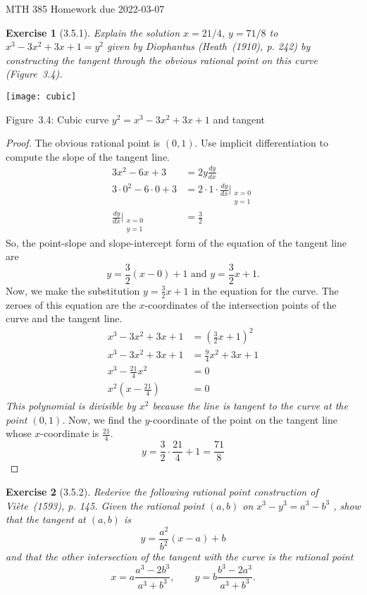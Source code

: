 \documentclass[12pt]{article}
\theoremstyle{plain}
\newtheorem{ex}{Exercise}
\begin{document}
MTH 385 \qquad Homework due 2022-03-07

\begin{ex} [3.5.1]
  Explain the solution $x=21/4$, $y=71/8$ to $x^3-3x^2+3x+1=y^2$ given by Diophantus (Heath~(1910), p. 242) by constructing the tangent through the obvious rational point on this curve (Figure~3.4).
\end{ex}

\begin{center}
\texttt{[image: cubic]}

Figure~3.4: Cubic curve $y^2=x^3-3x^2+3x+1$ and tangent
\end{center}

\begin{proof}
  The obvious rational point is $(0,1)$. Use implicit differentiation to compute the slope of the tangent line.
  \begin{align*}
    3x^2-6x+3                         &= 2y\frac{dy}{dx} \\
    3\cdot0^2-6\cdot0+3               &= 2\cdot1\cdot\frac{dy}{dx}\Bigg|_{\substack{x=0 \\ y=1}} \\
    \frac{dy}{dx}\Bigg|_{\substack{x=0 \\ y=1}} &= \frac{3}{2}
  \end{align*}
  So, the point-slope and slope-intercept form of the equation of the tangent line are
  \[
    y=\frac{3}{2}(x-0)+1\text{ and }y=\frac{3}{2}x+1.
  \]
  Now, we make the substitution $y=\frac{3}{2}x+1$ in the equation for the curve. The zeroes of this equation are the $x$-coordinates of the intersection points of the curve and the tangent line.
  \begin{align*}
    x^3-3x^2+3x+1                   &= \left(\frac{3}{2}x+1\right)^2 \\
    x^3-3x^2+3x+1                   &= \frac{9}{4}x^2+3x+1 \\
    x^3-\frac{21}{4}x^2             &= 0 \\
    x^2\left(x-\frac{21}{4}\right)  &= 0
  \end{align*}
  \emph{This polynomial is divisible by $x^2$ because the line is tangent to the curve at the point $(0,1)$.} Now, we find the $y$-coordinate of the point on the tangent line whose $x$-coordinate is $\frac{21}{4}$.
  \[
    y=\frac{3}{2}\cdot\frac{21}{4}+1=\frac{71}{8}
  \]
\end{proof}

\begin{ex} [3.5.2]
  Rederive the following rational point construction of Vi\`{e}te~(1593), p. 145. Given the rational point $(a,b)$ on $x^3-y^3=a^3-b^3$ , show that the tangent at $(a,b)$ is
  \[
    y=\frac{a^2}{b^2}(x-a)+b
  \]
  and that the other intersection of the tangent with the curve is the rational point
  \[
    x=a\frac{a^3-2b^3}{a^3+b^3},\qquad y=b\frac{b^3-2a^3}{a^3+b^3}.
  \]
\end{ex}
\end{document}
